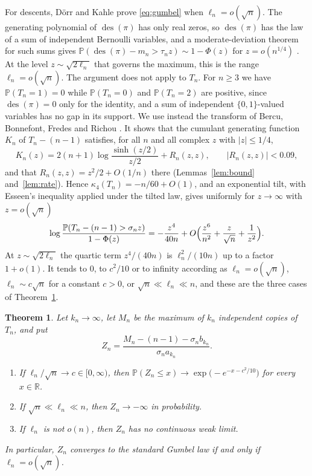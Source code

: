 \documentclass[11pt]{amsart}
\newtheorem{theorem}{Theorem}
\theoremstyle{remark}
\newcommand{\des}{\operatorname{des}}
\renewcommand{\P}{\mathbb{P}}
\newcommand{\R}{\mathbb{R}}
\begin{document}
For descents, D\"orr and Kahle \cite[Theorem~13(b)]{DK24} prove \eqref{eq:gumbel} when $\ell_n=o(\sqrt n)$. The generating polynomial of $\des(\pi)$ has only real zeros, so $\des(\pi)$ has the law of a sum of independent Bernoulli variables, and a moderate-deviation theorem for such sums gives $\P(\des(\pi)-m_n>\tau_nz)\sim1-\Phi(z)$ for $z=o(n^{1/4})$ \cite[Theorem~10 and Remark~12]{DK24}. At the level $z\sim\sqrt{2\ell_n}$ that governs the maximum, this is the range $\ell_n=o(\sqrt n)$. The argument does not apply to $T_n$. For $n\ge3$ we have $\P(T_n=1)=0$ while $\P(T_n=0)$ and $\P(T_n=2)$ are positive, since $\des(\pi)=0$ only for the identity, and a sum of independent $\{0,1\}$-valued variables has no gap in its support. We use instead the transform of Bercu, Bonnefont, Fredes and Richou \cite[Lemma~6.1]{BBFR24}. It shows that the cumulant generating function $K_n$ of $T_n-(n-1)$ satisfies, for all $n$ and all complex $z$ with $|z|\le1/4$,
\[
K_n(z)=2(n+1)\log\frac{\sinh(z/2)}{z/2}+R_n(z,z),\qquad |R_n(z,z)|<0.09,
\]
and that $R_n(z,z)=z^2/2+O(1/n)$ there (Lemmas~\ref{lem:bound} and~\ref{lem:rate}). Hence $\kappa_4(T_n)=-n/60+O(1)$, and an exponential tilt, with Esseen's inequality applied under the tilted law, gives uniformly for $z\to\infty$ with $z=o(\sqrt n)$
\begin{equation}\label{eq:tail}
\log\frac{\P(T_n-(n-1)>\sigma_nz)}{1-\Phi(z)}=-\frac{z^4}{40n}+O\Bigl(\frac{z^6}{n^2}+\frac z{\sqrt n}+\frac1{z^2}\Bigr).
\end{equation}
At $z\sim\sqrt{2\ell_n}$ the quartic term $z^4/(40n)$ is $\ell_n^2/(10n)$ up to a factor $1+o(1)$. It tends to $0$, to $c^2/10$ or to infinity according as $\ell_n=o(\sqrt n)$, $\ell_n\sim c\sqrt n$ for a constant $c>0$, or $\sqrt n\ll\ell_n\ll n$, and these are the three cases of Theorem~\ref{thm:main}.

\begin{theorem}\label{thm:main}
Let $k_n\to\infty$, let $M_n$ be the maximum of $k_n$ independent copies of $T_n$, and put
\[
Z_n=\frac{M_n-(n-1)-\sigma_nb_{k_n}}{\sigma_na_{k_n}}.
\]
\begin{enumerate}
\item[(a)] If $\ell_n/\sqrt n\to c\in[0,\infty)$, then $\P(Z_n\le x)\to\exp\bigl(-e^{-x-c^2/10}\bigr)$ for every $x\in\R$.
\item[(b)] If $\sqrt n\ll\ell_n\ll n$, then $Z_n\to-\infty$ in probability.
\item[(c)] If $\ell_n$ is not $o(n)$, then $Z_n$ has no continuous weak limit.
\end{enumerate}
In particular, $Z_n$ converges to the standard Gumbel law if and only if $\ell_n=o(\sqrt n)$.
\end{theorem}
\end{document}
